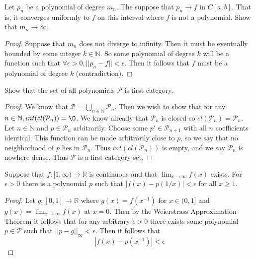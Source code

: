 \documentclass{article}
\theoremstyle{definition}
\begin{document}
\begin{mdframed}
    Let $p_n$ be a polynomial of degree $m_n$. The suppose that $p_n \rightarrow f$ in $C[a,b]$. That is, it converges uniformly to $f$ on 
    this interval where $f$ is not a polynomial. Show that $m_n \rightarrow \infty$.
\end{mdframed}
\begin{proof}
    Suppose that $m_n$ does not diverge to infinity. Then it must be eventually bounded by some integer $k \in \mathbb{N}$. So some polynomial of degree $k$
    will be a function such that $\forall \epsilon > 0, ||p_n - f|| < \epsilon$. Then it follows that $f$ must be a polynomial of degree $k$ (contradiction).
\end{proof}
\begin{mdframed}
    Show that the set of all polynomials $\mathcal{P}$ is first category.
\end{mdframed}
\begin{proof}
    We know that $\mathcal{P} = \bigcup_{n \in \mathbb{N}} \mathcal{P}_n$. Then we wish to show that for any $n \in \mathbb{N}, int(cl(\mathcal{P}_n)) = \O$.
    We know already that $\mathcal{P}_n$ is closed so $cl(\mathcal{P}_n) = \mathcal{P}_n$.
    Let $n \in \mathbb{N}$ and $p \in \mathcal{P}_n$ arbitrarily. Choose some $p' \in \mathcal{P}_{n+1}$ with all $n$ coefficients identical. This function can be made arbitrarily close to $p$,
    so we say that no neighborhood of $p$ lies in $\mathcal{P}_n$. Thus $int(cl(\mathcal{P}_n))$ is empty, and we say $\mathcal{P}_n$ is nowhere dense. Thus $\mathcal{P}$ is 
    a first category set.
\end{proof}
\begin{mdframed}
    Suppose that $f: [1, \infty) \rightarrow \mathbb{R}$ is continuous and that $\lim_{x\rightarrow \infty} f(x)$ exists.
    For $\epsilon >0$ there is a polynomial $p$ such that $|f(x) - p(1/x)| < \epsilon$ for all $x \geqslant 1$.
\end{mdframed}
\begin{proof}
    Let $g:[0,1] \rightarrow \mathbb{R}$ where $g(x) = f(x^{-1})$ for $x \in (0,1]$ and $g(x) = \lim_{x \rightarrow \infty}f(x)$ at $x = 0$. Then by the Weierstrass Approximation Theorem it follows that 
    for any arbitrary $\epsilon > 0$ there exists some polynomial $p \in \mathcal{P}$ such that $||p - g||_\infty < \epsilon$. Then it follows that 
    \[
        |f(x) - p(x^{-1})| < \epsilon
    \]
\end{proof}
\end{document}
